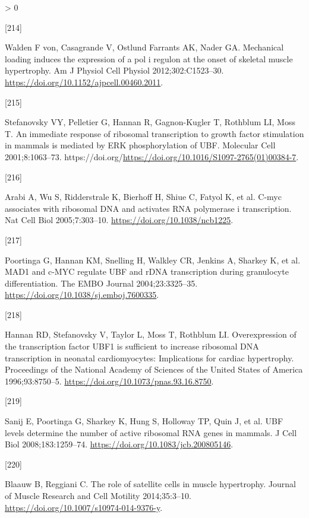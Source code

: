 \documentclass[twoside,10pt]{gihclass} %
\newlength{\cslhangindent}
\newlength{\csllabelwidth}
\newenvironment{CSLReferences}[3] %
 {%
  \setlength{\parindent}{0pt}
  \ifodd #1 \everypar{\setlength{\hangindent}{\cslhangindent}}\ignorespaces\fi
  \ifnum #2 > 0
  \setlength{\parskip}{#2\baselineskip}
  \fi
 }%
 {}
\newcommand{\CSLLeftMargin}[1]{\parbox[t]{\maxof{\widthof{#1}}{\csllabelwidth}}{#1}}
\newcommand{\CSLRightInline}[1]{\parbox[t]{\linewidth}{#1}}
\begin{document}
\begin{CSLReferences}{0}{0}
\leavevmode\hypertarget{ref-RN1828}{}%
\CSLLeftMargin{{[}214{]} }
\CSLRightInline{Walden F von, Casagrande V, Ostlund Farrants AK, Nader GA. Mechanical loading induces the expression of a pol i regulon at the onset of skeletal muscle hypertrophy. Am J Physiol Cell Physiol 2012;302:C1523--30. \url{https://doi.org/10.1152/ajpcell.00460.2011}.}

\leavevmode\hypertarget{ref-RN2604}{}%
\CSLLeftMargin{{[}215{]} }
\CSLRightInline{Stefanovsky VY, Pelletier G, Hannan R, Gagnon-Kugler T, Rothblum LI, Moss T. An immediate response of ribosomal transcription to growth factor stimulation in mammals is mediated by ERK phosphorylation of UBF. Molecular Cell 2001;8:1063--73. https://doi.org/\url{https://doi.org/10.1016/S1097-2765(01)00384-7}.}

\leavevmode\hypertarget{ref-RN1834}{}%
\CSLLeftMargin{{[}216{]} }
\CSLRightInline{Arabi A, Wu S, Ridderstrale K, Bierhoff H, Shiue C, Fatyol K, et al. C-myc associates with ribosomal DNA and activates RNA polymerase i transcription. Nat Cell Biol 2005;7:303--10. \url{https://doi.org/10.1038/ncb1225}.}

\leavevmode\hypertarget{ref-RN2565}{}%
\CSLLeftMargin{{[}217{]} }
\CSLRightInline{Poortinga G, Hannan KM, Snelling H, Walkley CR, Jenkins A, Sharkey K, et al. MAD1 and c-MYC regulate UBF and rDNA transcription during granulocyte differentiation. The EMBO Journal 2004;23:3325--35. \url{https://doi.org/10.1038/sj.emboj.7600335}.}

\leavevmode\hypertarget{ref-RN2566}{}%
\CSLLeftMargin{{[}218{]} }
\CSLRightInline{Hannan RD, Stefanovsky V, Taylor L, Moss T, Rothblum LI. Overexpression of the transcription factor UBF1 is sufficient to increase ribosomal DNA transcription in neonatal cardiomyocytes: Implications for cardiac hypertrophy. Proceedings of the National Academy of Sciences of the United States of America 1996;93:8750--5. \url{https://doi.org/10.1073/pnas.93.16.8750}.}

\leavevmode\hypertarget{ref-RN2556}{}%
\CSLLeftMargin{{[}219{]} }
\CSLRightInline{Sanij E, Poortinga G, Sharkey K, Hung S, Holloway TP, Quin J, et al. UBF levels determine the number of active ribosomal RNA genes in mammals. J Cell Biol 2008;183:1259--74. \url{https://doi.org/10.1083/jcb.200805146}.}

\leavevmode\hypertarget{ref-RN2080}{}%
\CSLLeftMargin{{[}220{]} }
\CSLRightInline{Blaauw B, Reggiani C. The role of satellite cells in muscle hypertrophy. Journal of Muscle Research and Cell Motility 2014;35:3--10. \url{https://doi.org/10.1007/s10974-014-9376-y}.}


\end{CSLReferences}
\end{document}
